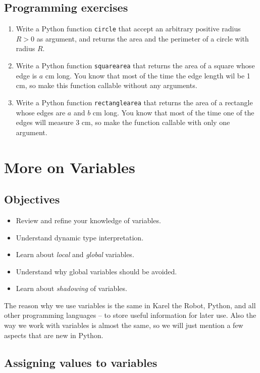 \subsection{Programming exercises}

\begin{enumerate}
\item Write a Python function {\tt circle} that accept an arbitrary positive radius $R > 0$
      as argument, and returns the area and the perimeter of a circle with radius $R$.
\item Write a Python function {\tt squarearea} that returns the area of a square whose 
      edge is $a$ cm long. You know that most of the time the edge length wil be 1 cm,
      so make this function callable without any arguments.
\item Write a Python function {\tt rectanglearea} that returns the area of a rectangle 
      whose edges are $a$ and $b$ cm long. You know that most of the time one of the edges 
      will measure 3 cm, so make the function callable with only one argument.
\end{enumerate}

\section{More on Variables}

\subsection{Objectives}

\begin{itemize}
\item Review and refine your knowledge of variables.
\item Understand dynamic type interpretation.
\item Learn about {\em local} and {\em global} variables.
\item Understand why global variables should be avoided.
\item Learn about {\em shadowing} of variables.
\end{itemize}
The reason why we use variables is the same in Karel the Robot, Python, and all other programming 
languages -- to store useful information for later use. Also the way we work with variables is almost the 
same, so we will just mention a few aspects that are new in Python.

\subsection{Assigning values to variables}

